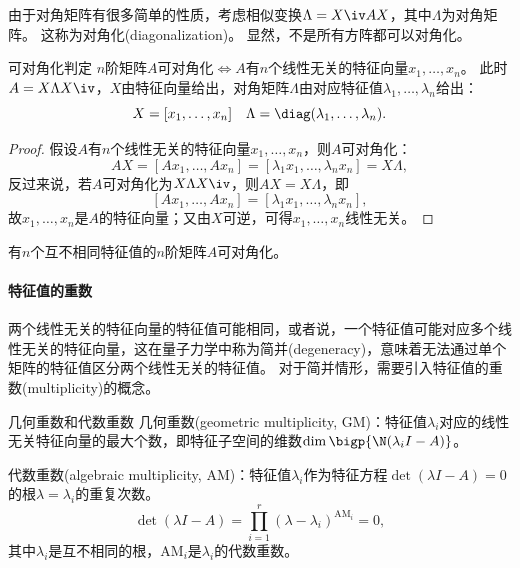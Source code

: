 由于对角矩阵有很多简单的性质，考虑相似变换$\Lambda=X\iv AX$，其中$\Lambda$为对角矩阵。
这称为对角化(diagonalization)。
显然，不是所有方阵都可以对角化。

\begin{theorem}{可对角化判定}{}
	$n$阶矩阵$A$可对角化$\iff A$有$n$个线性无关的特征向量$x_1,\ldots,x_n$。
	\tcblower
	此时$A=X\Lambda X\iv$，$X$由特征向量给出，对角矩阵$\Lambda$由对应特征值$\lambda_1,\ldots,\lambda_n$给出：
	\begin{equation}
		X=[x_1,\ldots,x_n]
		\quad
	\Lambda=\diag(\lambda_1,\ldots,\lambda_n).
	\end{equation}
\end{theorem}

\begin{proof}
	假设$A$有$n$个线性无关的特征向量$x_1,\ldots,x_n$，则$A$可对角化：
	\[
		AX=[Ax_1,\ldots,Ax_n]=[\lambda_1x_1,\ldots,\lambda_nx_n]=X\Lambda,
	\]
	反过来说，若$A$可对角化为$X\Lambda X\iv$，则$AX=X\Lambda$，即
	\[
		[Ax_1,\ldots,Ax_n]=[\lambda_1x_1,\ldots,\lambda_nx_n],
	\]
	故$x_1,\ldots,x_n$是$A$的特征向量；又由$X$可逆，可得$x_1,\ldots,x_n$线性无关。
\end{proof}

\begin{corollary}
	有$n$个互不相同特征值的$n$阶矩阵$A$可对角化。
\end{corollary}

\paragraph{特征值的重数}

两个线性无关的特征向量的特征值可能相同，或者说，一个特征值可能对应多个线性无关的特征向量，这在量子力学中称为简并(degeneracy)，意味着无法通过单个矩阵的特征值区分两个线性无关的特征值。
对于简并情形，需要引入特征值的重数(multiplicity)的概念。

\newcommand*{\GM}{\mathrm{GM}}
\newcommand*{\AM}{\mathrm{AM}}

\begin{definition}{几何重数和代数重数}{}
	几何重数(geometric multiplicity, GM)：特征值$\lambda_i$对应的线性无关特征向量的最大个数，即特征子空间的维数$\dim\bigp{\N(\lambda_iI-A)}$。

	代数重数(algebraic multiplicity, AM)：特征值$\lambda_i$作为特征方程$\det(\lambda I-A)=0$的根$\lambda=\lambda_i$的重复次数。
	\[
		\det(\lambda I-A)=\prod_{i=1}^r(\lambda-\lambda_i)^{\AM_i}=0,
	\]
	其中$\lambda_i$是互不相同的根，$\AM_i$是$\lambda_i$的代数重数。
\end{definition}

